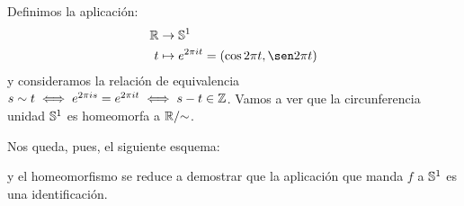 \begin{exa}
	Definimos la aplicación:
	\[\begin{split}
	\R&\to\esfera^1 \\
	t&\mapsto e^{2\pi it}=(\cos 2\pi t,\sen 2\pi t)
	\end{split}\]
	y consideramos la relación de equivalencia $s\sim t\iff e^{2\pi is}=e^{2\pi it}\iff s-t\in\mathbb{Z}$. Vamos a ver que la circunferencia unidad $\mathbb{S}^1$ es homeomorfa a $\mathbb{R}/\mathord{\sim}$.
	
	Nos queda, pues, el siguiente esquema:
	
	y el homeomorfismo se reduce a demostrar que la aplicación que manda $f$ a $\mathbb{S}^1$ es una identificación. 
	
\end{exa}